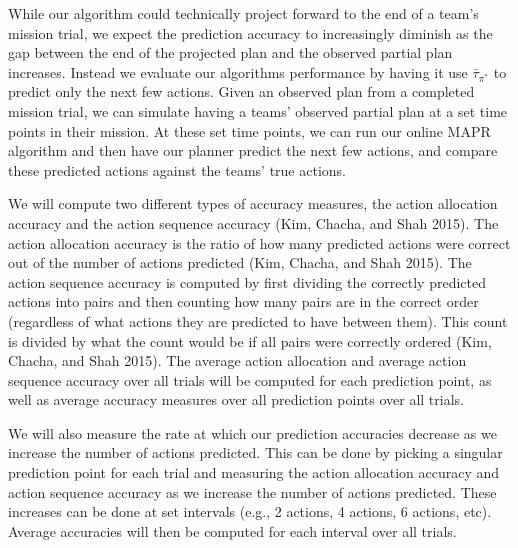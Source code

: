 While our algorithm could technically project forward to the end of a team's mission trial, we expect the prediction accuracy to increasingly diminish as the gap between the end of the projected plan and the observed partial plan increases. Instead we evaluate our algorithms performance by having it use $\bar{\tau}_{\pi^*}$ to predict only the next few actions. Given an observed plan from a completed mission trial, we can simulate having a teams' observed partial plan at a set time points in their mission. At these set time points, we can run our online MAPR algorithm and then have our planner predict the next few actions, and compare these predicted actions against the teams' true actions. 

We will compute two different types of accuracy measures, the action allocation accuracy and the action sequence accuracy (Kim, Chacha, and Shah 2015). The action allocation accuracy is the ratio of how many predicted actions were correct out of the number of actions predicted (Kim, Chacha, and Shah 2015). The action sequence accuracy is computed by first dividing the correctly predicted actions into pairs and then counting how many pairs are in the correct order (regardless of what actions they are predicted to have between them). This count is divided by what the count would be if all pairs were correctly ordered (Kim, Chacha, and Shah 2015). The average action allocation and average action sequence accuracy over all trials will be computed for each prediction point, as well as average accuracy measures over all prediction points over all trials. 

We will also measure the rate at which our prediction accuracies decrease as we increase the number of actions predicted. This can be done by picking a singular prediction point for each trial and measuring the action allocation accuracy and action sequence accuracy as we increase the number of actions predicted. These increases can be done at set intervals (e.g., 2 actions, 4 actions, 6 actions, etc).  Average accuracies will then be computed for each interval over all trials. 
